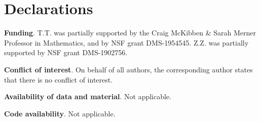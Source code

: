 \documentclass[11pt, a4paper,leqno]{amsart}
\theoremstyle{plain}
\theoremstyle{definition}
\theoremstyle{remark}
\numberwithin{equation}{section}
\begin{document}
\section*{Declarations}
\textbf{Funding}.
T.T. was partially supported by the Craig McKibben \& Sarah Merner Professor in Mathematics, and by NSF grant DMS-1954545. Z.Z. was partially supported by NSF grant DMS-1902756.

\textbf{Conflict of interest}.
On behalf of all authors, the corresponding author states that there is no conflict of interest.

\textbf{Availability of data and material}. Not applicable.

\textbf{Code availability}. Not applicable.





\end{document}
